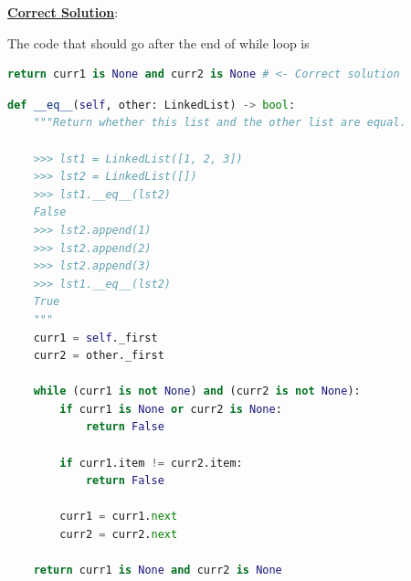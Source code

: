 \documentclass[12pt]{article}
\begin{document}
\begin{enumerate}[a.]
    \newpage

    \begin{mdframed}
        \underline{\textbf{Correct Solution}}:

        \bigskip

        The code that should go after the end of while loop is

        \begin{lstlisting}[language=Python]
        return curr1 is None and curr2 is None # <- Correct solution
        \end{lstlisting}
    \end{mdframed}

\end{enumerate}

\bigskip

\begin{lstlisting}[language=Python,caption={worksheet\_13\_q2\_solution.py},captionpos=b]
def __eq__(self, other: LinkedList) -> bool:
    """Return whether this list and the other list are equal.

    >>> lst1 = LinkedList([1, 2, 3])
    >>> lst2 = LinkedList([])
    >>> lst1.__eq__(lst2)
    False
    >>> lst2.append(1)
    >>> lst2.append(2)
    >>> lst2.append(3)
    >>> lst1.__eq__(lst2)
    True
    """
    curr1 = self._first
    curr2 = other._first

    while (curr1 is not None) and (curr2 is not None):
        if curr1 is None or curr2 is None:
            return False

        if curr1.item != curr2.item:
            return False

        curr1 = curr1.next
        curr2 = curr2.next

    return curr1 is None and curr2 is None
\end{lstlisting}
\end{document}
